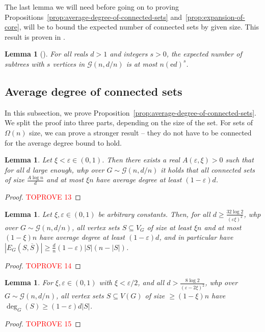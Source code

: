\documentclass[11pt]{article}
\theoremstyle{plain}
\newtheorem{lemma}[theorem]{Lemma}
\let\epsilon=\varepsilon
\newcommand{\G}{\mathcal{G}}
\newcommand{\emm}{\mathrm{e}}
\newcommand{\1}{\mathbb{1}}
\begin{document}
The last lemma we will need before going on to proving Propositions~\ref{prop:average-degree-of-connected-sets} and~\ref{prop:expansion-of-core}, will be to bound the expected number of connected sets by given size. This result is proven in \cite{fountoulakis2007evolution}.

\begin{lemma}[{\cite[(3)]{fountoulakis2007evolution}}]\label{lem:expected-number-of-subtrees}
    For all reals \(d > 1\) and integers \(s > 0\), the expected number of subtrees with \(s\) vertices in \(\G(n,d/n)\) is at most \(n(\emm d)^s\).
\end{lemma}


\subsection{Average degree of connected sets}\label{sec:avg-deg}

In this subsection, we prove Proposition~\ref{prop:average-degree-of-connected-sets}. We split the proof into three parts, depending on the size of the set. For sets of \(\Omega(n)\) size, we can prove a stronger result -- they do not have to be connected for the average degree bound to hold.

\begin{lemma}\label{lem:avg-deg-of-small-connected-sets}
    Let \(\xi < \epsilon \in(0,1)\). Then there exists a real \(A(\epsilon,\xi) > 0\) such that for all \(d\) large enough, whp over \(G\sim\G(n,d/n)\) it holds that all connected sets of size \(\tfrac{A\log n}{d}\) and at most \(\xi n\) have average degree at least \((1-\epsilon)d\).
\end{lemma}
\begin{proof}\textcolor{red}{TOPROVE 13}\end{proof}


\begin{lemma}\label{lem:avg-deg-of-medium-sets}
    Let \(\xi, \epsilon \in (0,1)\) be arbitrary constants. Then, for all \(d\geq\frac{32\log 2}{(\epsilon\xi)^2}\), whp over \(G\sim\G(n,d/n)\), all vertex sets \(S\subseteq V_G\) of size at least \(\xi n\) and at most \((1-\xi)n\) have average degree at least \((1-\epsilon)d\), and in particular have \(|E_G(S,\overline S)|\geq \frac{d}{n}(1-\epsilon)|S|(n-|S|)\).
\end{lemma}
\begin{proof}\textcolor{red}{TOPROVE 14}\end{proof}

\begin{lemma}\label{lem:avg-deg-of-large-sets}
    For \(\xi,\epsilon\in(0,1)\) with \(\xi < \epsilon / 2\), and all \(d > \frac{8\log 2}{(\epsilon - 2\xi)^2}\), whp over \(G\sim\G(n,d/n)\), \emph{all} vertex sets \(S\subseteq V(G)\) of size \(\geq(1-\xi)n\) have \(\deg_G(S)\geq(1-\epsilon)d|S|\).
\end{lemma}
\begin{proof}\textcolor{red}{TOPROVE 15}\end{proof}
\end{document}
